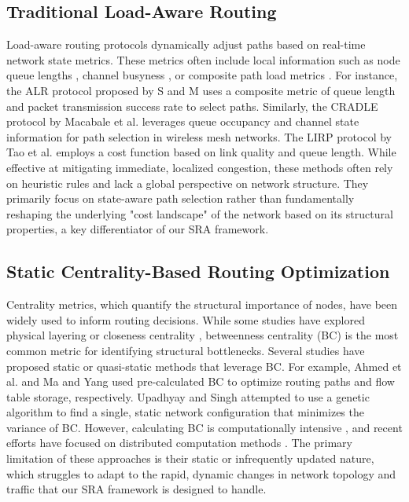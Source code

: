 \documentclass[journal]{IEEEtran}
\begin{document}
\subsection{Traditional Load-Aware Routing}
Load-aware routing protocols dynamically adjust paths based on real-time network state metrics. These metrics often include local information such as node queue lengths \cite{14}, channel busyness \cite{11}, or composite path load metrics \cite{4}. For instance, the ALR protocol proposed by S and M \cite{11} uses a composite metric of queue length and packet transmission success rate to select paths. Similarly, the CRADLE protocol by Macabale et al. \cite{14} leverages queue occupancy and channel state information for path selection in wireless mesh networks. The LIRP protocol by Tao et al. \cite{4} employs a cost function based on link quality and queue length. While effective at mitigating immediate, localized congestion, these methods often rely on heuristic rules and lack a global perspective on network structure. They primarily focus on state-aware path selection rather than fundamentally reshaping the underlying "cost landscape" of the network based on its structural properties, a key differentiator of our SRA framework.

\subsection{Static Centrality-Based Routing Optimization}
Centrality metrics, which quantify the structural importance of nodes, have been widely used to inform routing decisions. While some studies have explored physical layering \cite{1} or closeness centrality \cite{13}, betweenness centrality (BC) \cite{9, 12} is the most common metric for identifying structural bottlenecks. Several studies have proposed static or quasi-static methods that leverage BC. For example, Ahmed et al. \cite{7} and Ma and Yang \cite{18} used pre-calculated BC to optimize routing paths and flow table storage, respectively. Upadhyay and Singh \cite{6} attempted to use a genetic algorithm to find a single, static network configuration that minimizes the variance of BC. However, calculating BC is computationally intensive \cite{8}, and recent efforts have focused on distributed computation methods \cite{17, 19}. The primary limitation of these approaches is their static or infrequently updated nature, which struggles to adapt to the rapid, dynamic changes in network topology and traffic that our SRA framework is designed to handle.
\end{document}
